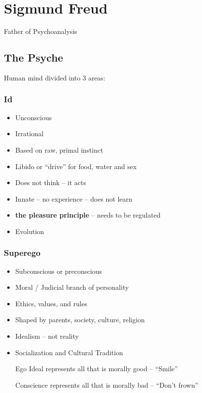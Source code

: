 \documentclass[11pt]{article}
\date{\today}
\title{}
\begin{document}
\section*{Sigmund Freud}
\label{sec:orgcce932a}
Father of Psychoanalysis

\subsection*{The Psyche}
\label{sec:orgd6fb9e7}
Human mind divided into 3 areas:

\subsubsection*{Id}
\label{sec:org97abaaa}
\begin{itemize}
\item Unconscious
\item Irrational
\item Based on raw, primal instinct
\item Libido or ``drive'' for food, water and sex
\item Does not think -- it acts
\item Innate -- no experience -- does not learn
\item \textbf{the pleasure principle} -- needs to be regulated
\item Evolution
\end{itemize}

\subsubsection*{Superego}
\label{sec:orgde7784b}
\begin{itemize}
\item Subconscious or preconscious
\item Moral / Judicial branch of personality
\item Ethics, values, and rules
\item Shaped by parents, society, culture, religion
\item Idealism -- not reality
\item Socialization and Cultural Tradition

Ego Ideal represents all that is morally good -- ``Smile''

Conscience represents all that is morally bad -- ``Don't frown''
\end{itemize}
\end{document}
